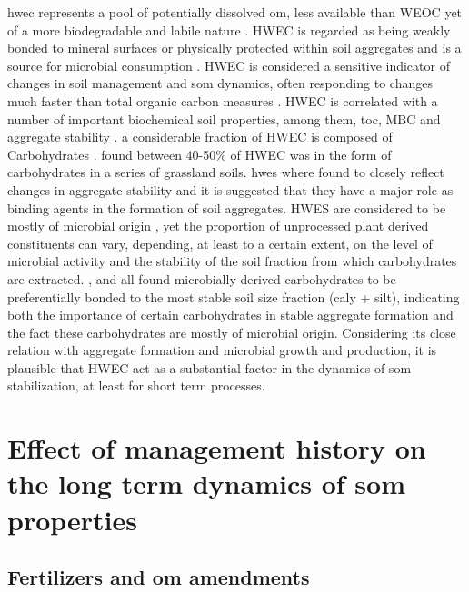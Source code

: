 	\gls{hwec} represents a pool of potentially dissolved \gls{om}, less available than WEOC yet of a more biodegradable and labile nature \citep{chantigny2014, leinweber1995, gregorich2003}. HWEC is regarded as being weakly bonded to mineral surfaces or physically protected within soil aggregates and is a source for microbial consumption \citep{zakharova2015, leinweber1995}.
	HWEC is considered a  sensitive indicator of changes in soil management and \gls{som} dynamics, often responding to changes much faster than total organic carbon measures \citep{ghani2003}. HWEC is correlated with a number of important biochemical soil properties, among them, \gls{toc}, MBC and aggregate stability \citep{hamkalo2014}.
	a considerable fraction of HWEC is composed of Carbohydrates \citep{leinweber1995, balaria2009}. \citet{ghani2003} found between 40-50\% of HWEC was in the form of carbohydrates in a series of grassland soils.
	\gls{hwes} where found to  closely reflect changes in aggregate stability \citep{haynes2005, yousefi2008, leguillou2012} and it is suggested that they have a major role as binding agents in the formation of soil aggregates.
	HWES are considered to be mostly of microbial origin \citep{haynes1993, debosz2002}, yet the proportion of unprocessed plant derived constituents can vary, depending, at least to a certain extent, on the level of microbial activity and the stability of the soil fraction from which carbohydrates are extracted. \citet{puget1998}, \citet{jolivet2006} and \citet{bock2007} all found microbially derived carbohydrates to be preferentially bonded to the most stable soil size fraction (caly + silt), indicating both the importance of certain  carbohydrates in stable aggregate formation and the fact these carbohydrates are mostly of microbial origin.
	Considering its close relation with aggregate formation and microbial growth and production, it is plausible that HWEC act as a substantial factor in  the dynamics of \gls{som} stabilization, at least for short term processes.

\section{Effect of management history on the long term dynamics of \gls{som} properties}

 	\subsection{Fertilizers and \gls{om} amendments}

